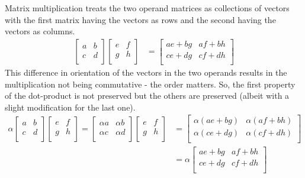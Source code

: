 \documentclass[MathsNotesBase.tex]{subfiles}
\begin{document}
{		Matrix multiplication treats the two operand matrices as collections of vectors with the first matrix having the vectors as rows and the second having the vectors as columns.
		\begin{align*}
			\begin{bmatrix}
			a & b \\
			c & d \\
			\end{bmatrix}
			\begin{bmatrix}
			e & f \\
			g & h \\
			\end{bmatrix}
			&=
			\begin{bmatrix}
			ae + bg & af + bh \\
			ce + dg & cf + dh \\
			\end{bmatrix}
		\end{align*}
		This difference in orientation of the vectors in the two operands results in the multiplication not being commutative - the order matters. So, the first property of the dot-product is not preserved but the others are preserved (albeit with a slight modification for the last one).
		\begin{align*}						
			\alpha
			\begin{bmatrix}
			a & b \\
			c & d \\
			\end{bmatrix}
			\begin{bmatrix}
			e & f \\
			g & h \\
			\end{bmatrix}
			=
			\begin{bmatrix}
			\alpha a & \alpha b \\
			\alpha c & \alpha d \\
			\end{bmatrix}
			\begin{bmatrix}
			e & f \\
			g & h \\
			\end{bmatrix}
			&=
			\begin{bmatrix}
			\alpha(ae + bg) & \alpha(af + bh) \\
			\alpha(ce + dg) & \alpha(cf + dh) \\
			\end{bmatrix} 
			\\
			&=
			\alpha
			\begin{bmatrix}
			ae + bg & af + bh \\
			ce + dg & cf + dh \\
			\end{bmatrix}		
		\end{align*}
		
}
\end{document}
